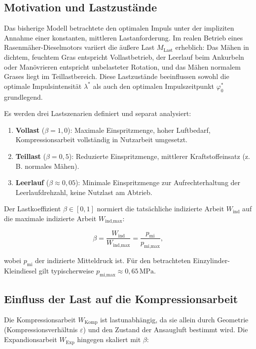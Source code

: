 ﻿\documentclass[a4paper,12pt]{article}
\begin{document}
\subsection{Motivation und Lastzustände}

Das bisherige Modell betrachtete den optimalen Impuls unter der impliziten Annahme
einer konstanten, mittleren Lastanforderung. Im realen Betrieb eines
Rasenmäher-Dieselmotors variiert die äußere Last $M_\text{Last}$ erheblich: Das
Mähen in dichtem, feuchtem Gras entspricht Vollastbetrieb, der Leerlauf beim
Ankurbeln oder Manövrieren entspricht unbelasteter Rotation, und das Mähen
normalem Grases liegt im Teillastbereich. Diese Lastzustände beeinflussen
sowohl die optimale Impulsintensität $\lambda^*$ als auch den optimalen
Impulszeitpunkt $\varphi_0^*$ grundlegend.

Es werden drei Lastszenarien definiert und separat analysiert:

\begin{enumerate}
  \item \textbf{Vollast} ($\beta = 1{,}0$): Maximale Einspritzmenge, hoher
    Luftbedarf, Kompressionsarbeit vollständig in Nutzarbeit umgesetzt.
  \item \textbf{Teillast} ($\beta = 0{,}5$): Reduzierte Einspritzmenge, mittlerer
    Kraftstoffeinsatz (z.\,B. normales Mähen).
  \item \textbf{Leerlauf} ($\beta \approx 0{,}05$): Minimale Einspritzmenge zur
    Aufrechterhaltung der Leerlaufdrehzahl, keine Nutzlast am Abtrieb.
\end{enumerate}

Der Lastkoeffizient $\beta \in [0, 1]$ normiert die tatsächliche indizierte
Arbeit $W_\text{ind}$ auf die maximale indizierte Arbeit $W_\text{ind,max}$:

\begin{equation}
  \beta = \frac{W_\text{ind}}{W_\text{ind,max}} =
    \frac{p_\text{mi}}{p_\text{mi,max}},
  \label{eq:beta}
\end{equation}

\noindent
wobei $p_\text{mi}$ der indizierte Mitteldruck ist. Für den betrachteten
Einzylinder-Kleindiesel gilt typischerweise $p_\text{mi,max} \approx 0{,}65\,\text{MPa}$.

\subsection{Einfluss der Last auf die Kompressionsarbeit}

Die Kompressionsarbeit $W_\text{Komp}$ ist lastunabhängig, da sie allein durch
Geometrie (Kompressionsverhältnis $\varepsilon$) und den Zustand der Ansaugluft
bestimmt wird. Die Expandionsarbeit $W_\text{Exp}$ hingegen skaliert mit $\beta$:
\end{document}
